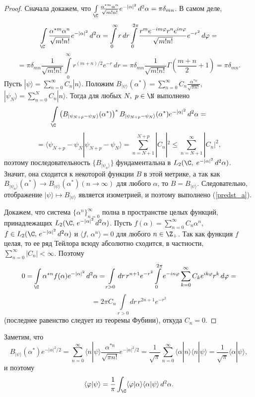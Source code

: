 \documentclass[a4paper
]{article}
\begin{document}
\begin{proof}
Сначала докажем, что $\int \limits_{\C}\frac{\alpha^{*m}\alpha^n}{\sqrt{m!
n!}}e^{-|\alpha|^2}\, d^2\alpha=\pi \delta_{mn}$. В самом деле,
$$\int \limits_{\C}\frac{\alpha^{*m}\alpha^n}{\sqrt{m!n!}}e^{-|\alpha|^2}
\, d^2\alpha=\int \limits _0^\infty r\, dr \int\limits_0^{2\pi}\frac{r^m
e^{-im\varphi}r^ne^{in\varphi}}{\sqrt{m!n!}}e^{-r^2}\, d\varphi=$$
$$=\pi \delta_{mn}\frac{1}{\sqrt{m!n!}}\int \limits_{0}^\infty
r^{(m+n)/2}e^{-r}\, dr=\pi \delta_{mn}\frac{1}{\sqrt{m!n!}}\Gamma
\left(\frac{m+n}{2}+1\right)=\pi \delta_{mn}.$$
Пусть $|\psi\rangle=\sum\limits_{n=0}^\infty C_n|n\rangle$. Положим
$B_{|\psi\rangle}(\alpha^*)=\sum \limits _{n=0}^{\infty}C_n\frac{\alpha^{*n}}
{\sqrt{\pi n!}}$, $|\psi_N\rangle=\sum \limits_{n=0}^N C_n|n\rangle$. Тогда
для любых $N, \; p\in \N$ выполнено
$$\int \limits_{\C}\left(B_{|\psi_{N+p}-\psi_N\rangle}(\alpha^*)\right)^*
B_{|\psi_{N+p}-\psi_N\rangle}(\alpha^*)e^{-|\alpha|^2}\, d^2\alpha=$$
$$=\langle \psi_{N+p}-\psi_N|\psi_{N+p}-\psi_N\rangle=\sum \limits _{n=N+1}
^{N+p}|C_n|^2\le \sum \limits _{n=N+1}^\infty|C_n|^2,$$ поэтому
последовательность $\{B_{|\psi_n\rangle}\}$ фундаментальна в $L_2(\C, \;
e^{-|\alpha|^2}\, d^2\alpha)$. Значит, она сходится к некоторой
функции $B$ в этой метрике, а так как $B_{|\psi_n\rangle}(\alpha^*)
\rightarrow B_{|\psi\rangle}(\alpha^*)(n\rightarrow \infty)$ для любого
$\alpha$, то $B=B_{|\psi\rangle}$. Следовательно, отображение $|\psi
\rangle\mapsto B_{|\psi\rangle}$ является изометрией, и поэтому
выполнено (\ref{predst_a}). \par
Докажем, что система $\{\alpha^n\}_{n=0}^\infty$ полна в пространстве
целых функций, принадлежащих $L_2(\C, \, e^{-|\alpha|^2}\,
d^2\alpha)$. Пусть $f(\alpha)=\sum \limits_{n=0}^\infty C_n\alpha^n$,
$f\in L_2(\C, \, e^{-|\alpha|^2}\, d^2\alpha)$ и $\langle f, \, \alpha^n
\rangle=0$ для любого $n\in \Z_+$. Так как функция $f$ целая, то ее ряд
Тейлора всюду абсолютно сходится, в частности, $\sum \limits _{n=0}^\infty
|C_n|<\infty$. Поэтому
$$0=\int \limits_{\C}\alpha^{*n}f(\alpha)e^{-|\alpha|^2}\, d^2\alpha =\int
\limits _{r>0}dr\, r^{n+1}e^{-r^2}\int \limits_0^{2\pi}
e^{-in\varphi}\sum \limits_{k=0}^\infty C_ke^{ik\varphi}r^k\, d\varphi=$$
$$=2\pi C_n\int \limits_{r>0}dr\, r^{2n+1}e^{-r^2}$$ (последнее равенство
следует из теоремы Фубини), откуда $C_n=0$.
\end{proof}
Заметим, что $$B_{|\psi\rangle}(\alpha^*)e^{-|\alpha|^2/2}=\sum \limits
_{n=0}^\infty \langle n|\psi\rangle\frac{\alpha^{*n}}{\sqrt{\pi n!}}
e^{-|\alpha|^2/2}=\frac{1}{\sqrt{\pi}}\sum \limits_{n=0}^\infty \langle
\alpha|n\rangle\langle n|\psi\rangle=\frac{1}{\sqrt{\pi}}\langle \alpha|
\psi\rangle,$$ и поэтому $$\langle \varphi|\psi\rangle=\frac{1}{\pi}
\int_{\C}\langle \varphi|\alpha\rangle\langle\alpha|\psi\rangle\, d^2
\alpha.$$
\end{document}
